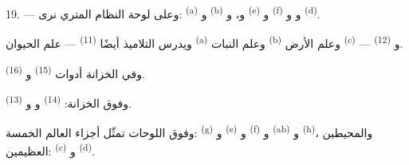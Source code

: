 19. --- وعلى لوحة النظام المتري نرى:  \textsuperscript{(a)}
و \textsuperscript{(b)} و، و
\textsuperscript{(e)} و \textsuperscript{(f)} و
و \textsuperscript{(d)}.

ويدرس التلاميذ أيضًا  \textsuperscript{(11)} --- علم
الحيوان \textsuperscript{(a)} وعلم النبات \textsuperscript{(b)} وعلم الأرض
\textsuperscript{(c)} --- و \textsuperscript{(12)}.

وفي الخزانة أدوات  \textsuperscript{(15)} و
\textsuperscript{(16)}.

وفوق الخزانة:  \textsuperscript{(14)} و
و \textsuperscript{(13)}.

وفوق اللوحات  تمثّل أجزاء العالم الخمسة: 
\textsuperscript{(g)} و \textsuperscript{(e)} و
\textsuperscript{(f)} و \textsuperscript{(ab)} و
\textsuperscript{(h)}، والمحيطين العظيمين:  \textsuperscript{(c)}
و \textsuperscript{(d)}.
\VUsaut{6.0mm}
\VUfilet{22mm}
